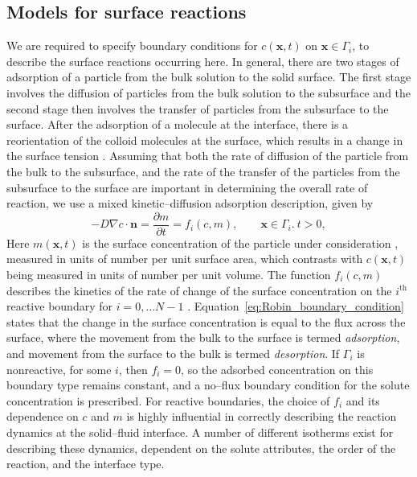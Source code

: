 \documentclass[preprint, 1p, authoryear]{elsarticle}
\begin{document}
\subsection{Models for surface reactions}
We are required to specify boundary conditions for $c(\mathbf{x},t)$ on  $\mathbf{x} \in \Gamma_i$, to describe the surface reactions occurring here.  In general, there are two stages of adsorption of a particle from the bulk solution to the solid surface. The first stage involves the diffusion of  particles from the bulk solution to the subsurface and the  second stage then involves the transfer of  particles  from the subsurface to the surface.  After the adsorption of a molecule at the interface, there is a reorientation of the colloid molecules at the surface, which results in a change in the surface tension \citep{birdi2008handbook}.  Assuming that both the rate of diffusion of the particle from the bulk to the subsurface, and the rate of the transfer of the particles from the subsurface to the surface are  important  in determining the overall rate of reaction, we use a mixed kinetic--diffusion adsorption description, given by
\begin{equation}
-D \nabla c \cdot \mathbf{n} = \frac{\partial m}{\partial t} = f_i(c, m), \qquad \mathbf{x} \in \Gamma_i. \: t >0, \label{eq:Robin_boundary_condition}
\end{equation}
Here $m(\mathbf{x},t)$  is the surface concentration of the particle under consideration \citep{birdi2008handbook}, measured in units of number per unit surface area, which contrasts with $c(\mathbf{x},t)$ being  measured in units of number per unit volume.   
The function $f_i(c,m)$ describes the kinetics of the  rate of change of the surface concentration  on the $i^{\text{th}}$ reactive boundary for $i=0, \ldots N-1$  \citep{Danov2002Adsorption}. 
Equation~\eqref{eq:Robin_boundary_condition}  states that the change in the surface concentration is equal to the flux across the surface, where the movement from the bulk to the surface is  termed \emph{adsorption}, and movement from the surface to the bulk is  termed \emph{desorption}.
If $\Gamma_i$ is nonreactive, for some $i$, then $f_i = 0$, so the adsorbed concentration on this boundary type remains constant, and a no--flux boundary condition for the solute concentration  is prescribed. For reactive boundaries, the choice of $f_i$ and its dependence on $c$ and $m$ is highly influential in correctly describing the reaction dynamics at the solid--fluid interface. A number of different isotherms exist for describing these dynamics, dependent on the solute attributes, the order of the reaction, and the interface type. 
\end{document}
